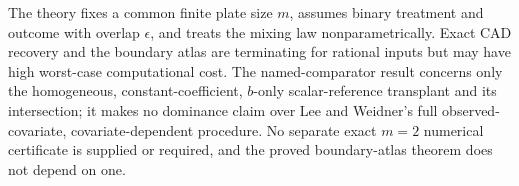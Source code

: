 The theory fixes a common finite plate size \(m\), assumes binary treatment and outcome with overlap \(\epsilon\), and treats the mixing law nonparametrically. Exact CAD recovery and the boundary atlas are terminating for rational inputs but may have high worst-case computational cost. The named-comparator result concerns only the homogeneous, constant-coefficient, \(b\)-only scalar-reference transplant and its intersection; it makes no dominance claim over Lee and Weidner's full observed-covariate, covariate-dependent procedure. No separate exact \(m=2\) numerical certificate is supplied or required, and the proved boundary-atlas theorem does not depend on one.